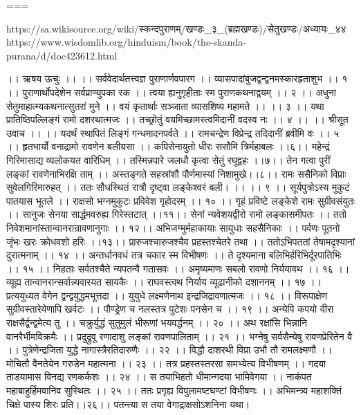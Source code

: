===

https://sa.wikisource.org/wiki/स्कन्दपुराणम्/खण्डः_३_(ब्रह्मखण्डः)/सेतुखण्डः/अध्यायः_४४
https://www.wisdomlib.org/hinduism/book/the-skanda-purana/d/doc423612.html

।। ऋषय ऊचुः ।। ।।
सर्ववेदार्थतत्त्वज्ञ पुराणार्णवपारग ।।
व्यासपादांबुजद्वन्द्वनमस्कारहृताशुभ ।। १ ।।
पुराणार्थोपदेशेन सर्वप्राण्युपका रक ।।
त्वया ह्यनुगृहीताः स्म पुराणकथनाद्वयम् ।। २ ।।
अधुना सेतुमाहात्म्यकथनात्सुतरां मुने ।।
वयं कृतार्थाः सञ्जाता व्यासशिष्य महामते ।। ।। ३ ।।
यथा प्रातिष्ठिपल्लिङ्गं रामो दशरथात्मजः ।।
तच्छ्रोतुं वयमिच्छामस्त्वमिदानीं वदस्व नः ।। ४ ।।
।। श्रीसूत उवाच ।। ।।
यदर्थं स्थापितं लिङ्गं गन्धमादनपर्वते ।।
रामचन्द्रेण विप्रेन्द्र तदिदानीं ब्रवीमि वः ।। ५ ।।
हृतभार्यो वनाद्रामो रावणेन बलीयसा ।।
कपिसेनायुतो धीरः ससौमि त्रिर्महाबलः ।।६।।
महेन्द्रं गिरिमासाद्य व्यलोकयत वारिधिम् ।।
तस्मिन्नपारे जलधौ कृत्वा सेतुं रघूद्वहः ।।७।।
तेन गत्वा पुरीं लङ्कां रावणेनाभिरक्षि ताम् ।।
अस्तङ्गते सहस्रांशौ पौर्णमास्यां निशामुखे।।८।।
रामः ससैनिको विप्राः सुवेलगिरिमारुहत् ।।
ततः सौधस्थितं रात्रौ दृष्ट्वा लङ्केश्वरं बली। ।। ।। ९ ।।
सूर्यपुत्रोऽस्य मुकुटं पातयास भूतले ।।
राक्षसो भग्नमुकुटः प्रविवेश गृहोदरम् ।। १० ।।
गृहं प्रविष्टे लङ्केशे रामः सुग्रीवसंयुतः ।।
सानुजः सेनया सार्द्धमवरुह्य गिरेस्तटात् ।।११।।
सेनां न्यवेशयद्वीरो रामो लङ्कासमीपतः ।।
ततो निवेशमानांस्तान्वानरान्रावणानुगाः ।। १२।।
अभिजग्मुर्महाकायाः सायुधाः सहसैनिकाः ।।
पर्वणः पूतनो जृंभः खरः क्रोधवशो हरिः ।।१३।।
प्रारुजश्चारुजश्चैव प्रहस्तश्चेतरे तथा ।।
ततोऽभिपततां तेषामदृश्यानां दुरात्मनाम् ।। १४ ।।
अन्तर्धानवधं तत्र चकार स्म विभीषणः ।।
ते दृश्यमाना बलिभिर्हरिभिर्दूरपातिभिः ।। १५ ।।
निहताः सर्वतश्चैते न्यपतन्वै गतासवः ।।
अमृष्यमाणः सबलो रावणो निर्ययावथ ।। १६ ।।
व्यूह्य तान्वानरान्सर्वान्न्यवारयत सायकैः ।।
राघवस्त्वथ निर्याय व्यूढानीको दशाननम् ।। १७ ।।
प्रत्ययुध्यत वेगेन द्वन्द्वयुद्धमभूत्तदा ।।
युयुधे लक्ष्मणेनाथ इन्द्रजिद्रावणात्मजः ।। १८ ।।
विरूपाक्षेण सुग्रीवस्तारेयेणापि खर्वटः ।।
पौण्ड्रेण च नलस्तत्र पुटेशः पनसेन च ।। १९ ।।
अन्येपि कपयो वीरा राक्षसैर्द्वन्द्वमेत्य तु ।।
चक्रुर्युद्धं सुतुमुलं भीरूणां भयवर्द्धनम् ।। २० ।।
अथ रक्षांसि भिन्नानि वानरैर्भीमविक्रमैः ।।
प्रदुद्रुवू रणादाशु लङ्कां रावणपालिताम् ।। २१ ।।
भग्नेषु सर्वसैन्येषु रावणप्रेरितेन वै ।।
पुत्रेणेन्द्रजिता युद्धे नागास्त्रैरतिदारुणैः ।। २२ ।।
विद्धौ दाशरथी विप्रा उभौ तौ रामलक्ष्मणौ ।।
मोचितौ वैनतेयेन गरुडेन महात्मना ।। २३ ।।
तत्र प्रहस्तस्तरसा समभ्येत्य विभीषणम् ।।
गदया ताडयामास विनद्य रणकर्कशः ।। २४ ।।
स तयाभिहतो धीमान्गदया भामिवेगया ।।
नाकंपत महाबाहुर्हिमवानिव सुस्थितः ।। २५ ।।
ततः प्रगृह्य विपुलामष्टघण्टां विभीषणः ।।
अभिमन्त्र्य महाशक्तिं चिक्षे पास्य शिरः प्रति।।२६।।
पतन्त्या स तया वेगाद्राक्षसोऽशनिना यथा।
